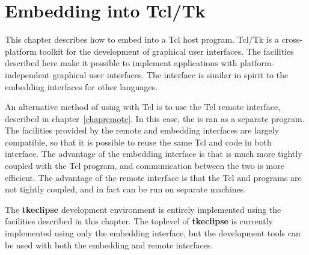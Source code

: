 %
% 
% 
% 
% 
%
%
%

\chapter{Embedding into Tcl/Tk}
\label{chaptcl}

This chapter describes how to embed {\eclipse} into a Tcl host program.
Tcl/Tk is a cross-platform toolkit for the development of graphical
user interfaces. 
The facilities described here make it possible to implement {\eclipse}
applications with platform-independent graphical user interfaces.
The interface is similar in spirit to the {\eclipse} embedding
interfaces for other languages.

An alternative method of using {\eclipse} with Tcl is to use the Tcl remote
interface, described in chapter~\ref{chapremote}. In this case, the
{\eclipse} is ran as a separate program. The facilities provided by the
remote and embedding interfaces are largely compatible, so that it is
possible to reuse the same Tcl and {\eclipse} code in both interface. The
advantage of the embedding interface is that {\eclipse} is much more
tightly coupled with the Tcl program, and communication between the two is
more efficient. The advantage of the remote interface is that the Tcl and
{\eclipse} programs are not tightly coupled, and in fact can be run on
separate machines.  

The {\bf tkeclipse} development environment is entirely
implemented using the facilities described in this chapter. The toplevel of
{\bf tkeclipse} is currently implemented using only the embedding interface,
but the development tools can be used with both the embedding and remote
interfaces. 



